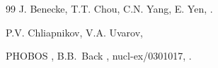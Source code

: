 \documentclass[twocolumn,showpacs,preprintnumbers,prd,superscriptaddress,nofootinbib]{revtex4}
\begin{document}
\begin{thebibliography}{99}
 J. Benecke, T.T. Chou, C.N. Yang, E. Yen,
.






  P.V. Chliapnikov, V.A. Uvarov, 

  PHOBOS \col, B.B.~Back \ea,  nucl-ex/0301017,
 .


\end{thebibliography}
\end{document}
